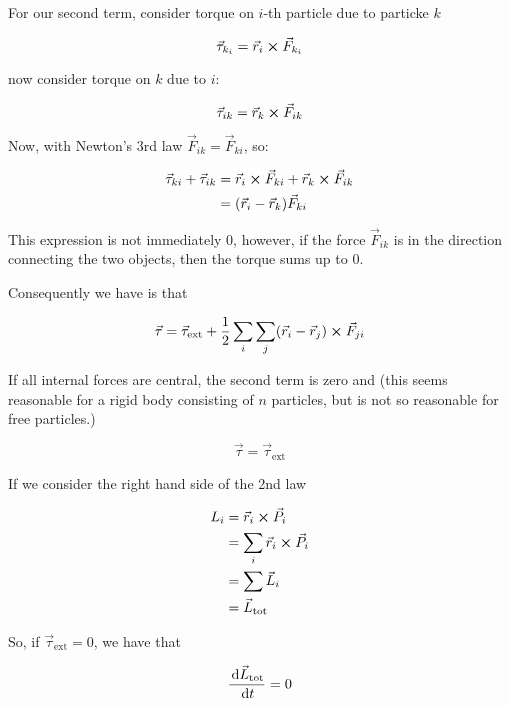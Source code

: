 For our second term, consider torque on $i$-th particle due to particke $k$

\begin{equation}
	\vec\tau_{k_i} = \vec r_i \cross \vec F_{k_i}
\end{equation}

now consider torque on $k$ due to $i$:

\begin{equation}
	\vec\tau_{ik} = \vec r_{k} \cross \vec F_{ik}
\end{equation}

Now, with Newton's 3rd law $\vec F_{ik} = \vec F_{ki}$, so:

\begin{align}
	\vec\tau_{ki} + \vec\tau_{ik} &= \vec r_i \cross \vec F_{ki} + \vec r_k \cross \vec F_{ik}\\
	&= (\vec r_i - \vec r_k) \vec F_{ki}
\end{align}


This expression is not immediately 0, however, if the force $\vec F_{ik}$ is in the direction connecting the two objects, then the torque sums up to 0.

Consequently we have is that

\begin{equation}
	\vec \tau = \vec\tau_\mathrm{ext} + \frac{1}{2} \sum_i \sum_j (\vec r_i - \vec r_j) \cross \vec F_{ji} 
\end{equation}

If all internal forces are central, the second term is zero and (this seems reasonable for a rigid body consisting of $n$ particles, but is not so reasonable for free particles.)

\begin{equation}
	\vec\tau = \vec\tau_\mathrm{ext}
\end{equation}

If we consider the right hand side of the 2nd law

\begin{align}
	L_i &= \vec r_i \cross \vec P_i\\
	&= \sum_i \vec r_i \cross \vec P_i\\
	&= \sum \vec L_i\\
	&= \vec L_\mathrm{tot}
\end{align}

So, if $\vec\tau_\mathrm{ext} = 0$, we have that

\begin{equation}
	\frac{\D \vec L_\mathrm{tot}}{\D t} = 0
\end{equation}

